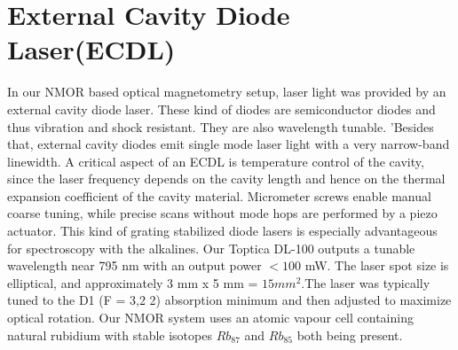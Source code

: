 \section{External Cavity Diode Laser(ECDL)}
\bigskip
In our NMOR based optical magnetometry setup, laser light was provided by an external cavity diode laser. These kind of diodes are semiconductor diodes and thus vibration and shock resistant. They are also wavelength tunable. ’Besides that, external cavity diodes emit single mode laser light with a very narrow-band linewidth. A critical aspect of an ECDL is temperature control of the cavity, since the laser frequency depends on the cavity length and hence on the thermal expansion coefficient of the cavity material. Micrometer screws enable manual coarse tuning, while precise scans without mode hops are performed by a piezo actuator. This kind of grating stabilized diode lasers is especially advantageous for spectroscopy with the alkalines. Our Toptica DL-100 outputs a tunable wavelength near 795 nm with an output power $<100$ mW. The laser spot size is elliptical, and approximately 3 mm x 5 mm = $15 mm^2$.The laser was typically tuned to the D1 (F = 3,2 2) absorption minimum and then adjusted to maximize optical rotation. Our NMOR system uses an atomic vapour cell containing natural rubidium with stable isotopes $Rb_{87}$ and $Rb_{85}$ both being present.

